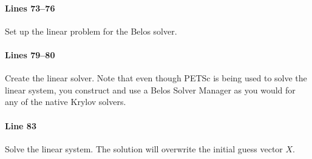 \paragraph{Lines 73--76}
Set up the linear problem for the Belos solver.

\paragraph{Lines 79--80}
Create the linear solver.  Note that even though PETSc is being used to solve
the linear system, you construct and use a Belos Solver Manager as you would for
any of the native Krylov solvers.

\paragraph{Line 83}
Solve the linear system.  The solution will overwrite the initial guess vector
$X$.
